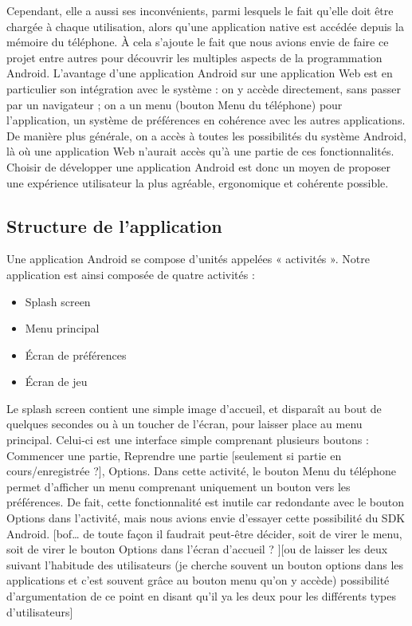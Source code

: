 \documentclass[a4paper]{report}
\begin{document}
			Cependant, elle a aussi ses inconvénients, parmi lesquels le fait qu’elle doit être chargée à chaque utilisation, alors qu’une application native est accédée depuis la mémoire 			du téléphone. À cela s’ajoute le fait que nous avions envie de faire ce projet entre autres pour découvrir les multiples aspects de la programmation Android. L’avantage d’une 				application Android sur une application Web est en particulier son intégration avec le système : on y accède directement, sans passer par un navigateur ; on a un menu (bouton 				Menu du téléphone) pour l’application, un système de préférences en cohérence avec les autres applications. De manière plus générale, on a accès à toutes les possibilités du 				système Android, là où une application Web n’aurait accès qu’à une partie de ces fonctionnalités. Choisir de développer une application Android est donc un moyen de proposer une 				expérience utilisateur la plus agréable, ergonomique et cohérente possible.\\
		\subsection{Structure de l’application}
			Une application Android se compose d’unités appelées « activités ». Notre application est ainsi composée de quatre activités :\\
			\begin{itemize}
			    \item Splash screen
			    \item Menu principal
			    \item Écran de préférences
			    \item Écran de jeu
			\end{itemize}

			Le splash screen contient une simple image d’accueil, et disparaît au bout de quelques secondes ou à un toucher de l’écran, pour laisser place au menu principal. Celui-ci est 				une interface simple comprenant plusieurs boutons : Commencer une partie, Reprendre une partie [seulement si partie en cours/enregistrée ?], Options. Dans cette activité, le 				bouton Menu du téléphone permet d’afficher un menu comprenant uniquement un bouton vers les préférences. De fait, cette fonctionnalité est inutile car redondante avec le bouton 				Options dans l’activité, mais nous avions envie d’essayer cette possibilité du SDK Android. [bof… de toute façon il faudrait peut-être décider, soit de virer le menu, soit de 				virer le bouton Options dans l’écran d’accueil ? ][ou de laisser les deux suivant l’habitude des utilisateurs (je cherche souvent un bouton options dans les applications et 				c’est souvent grâce au bouton menu qu’on y accède) possibilité d’argumentation de ce point en disant qu’il ya les deux pour les différents types d’utilisateurs]\\
\end{document}

